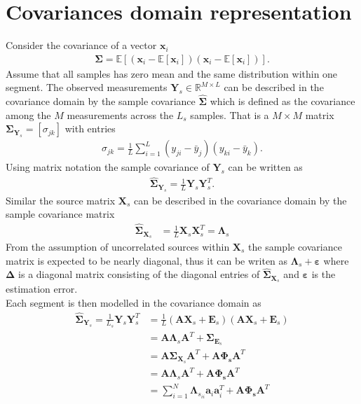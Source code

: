 \section{Covariances domain representation}
Consider the covariance of a vector $\textbf{x}_i$  
\begin{align*}
\boldsymbol{\Sigma}=\mathbb{E}[(\textbf{x}_i-\mathbb{E}[\textbf{x}_i])(\textbf{x}_i-\mathbb{E}[\textbf{x}_i])].
\end{align*} 
Assume that all samples has zero mean and the same distribution within one segment. The observed measurements $\mathbf{Y}_s \in \mathbb{R}^{M\times L}$ can be described in the covariance domain by the sample covariance $\hat{\boldsymbol{\Sigma}}$ which is defined as the covariance among the $M$ measurements across the $L_s$ samples. That is a $M \times M$ matrix $\boldsymbol{\Sigma}_{\mathbf{Y}_s}=[\sigma_{jk}]$ with entries 
\begin{align*}
\sigma_{jk}= \frac{1}{L}\sum_{i=1}^{L}(y_{ji}- \bar{y}_j)(y_{ki}-\bar{y}_k).
\end{align*}
Using matrix notation the sample covariance of $\mathbf{Y}_s$ can be written as
\begin{align*}
\hat{\boldsymbol{\Sigma}}_{\mathbf{Y}_s} = \frac{1}{L} \mathbf{Y}_s \mathbf{Y}_s^T.
\end{align*}  
Similar the source matrix $\mathbf{X}_s$ can be described in the covariance domain by the sample covariance matrix
\begin{align*}
\hat{\boldsymbol{\Sigma}}_{\mathbf{X}_s} &= \frac{1}{L} \mathbf{X}_s \mathbf{X}_s^T = \boldsymbol{\Lambda}_s
\end{align*}
From the assumption of uncorrelated sources within $\mathbf{X}_s$ the sample covariance matrix is expected to be nearly diagonal, thus it can be writen as $\boldsymbol{\Lambda}_s + \boldsymbol{\varepsilon}$ where $\boldsymbol{\Delta}$ is a diagonal matrix consisting of the diagonal entries of $\hat{\boldsymbol{\Sigma}}_{\mathbf{X}_s}$ and $ \boldsymbol{\varepsilon}$ is the estimation error\cite{Balkan2015}.
\\
Each segment is then modelled in the covariance domain as
\begin{align}\label{eq:cov_model}
\hat{\boldsymbol{\Sigma}}_{\mathbf{Y}_s} = 
\frac{1}{L_s}\mathbf{Y}_s \mathbf{Y}_s^T &= 
\frac{1}{L} \left( \mathbf{A} \mathbf{X}_s + \mathbf{E}_s \right) \left( \mathbf{A} \mathbf{X}_s + \mathbf{E}_s\right) \nonumber \\ 
&= \mathbf{A} \boldsymbol{\Lambda}_s \mathbf{A}^T + \boldsymbol{\Sigma}_{\mathbf{E}_s} \nonumber \\
&= \mathbf{A} \boldsymbol{\Sigma}_{\mathbf{X}_s} \mathbf{A}^T + \mathbf{A} \boldsymbol{\Phi_s} \mathbf{A}^T  \nonumber \\
&= \mathbf{A} \boldsymbol{\Lambda}_s \mathbf{A}^T + \mathbf{A} \boldsymbol{\Phi_s} \mathbf{A}^T \nonumber \\
&= \sum_{i=1}^{N} \boldsymbol{\Lambda}_{s_{ii}} \textbf{a}_i\textbf{a}_i^{T} + \mathbf{A} \boldsymbol{\Phi_s} \mathbf{A}^T
\end{align}
